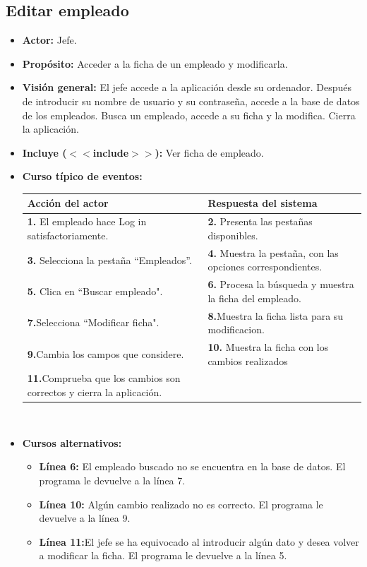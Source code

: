 \documentclass[spanish,a4paper,11pt, twoside]{report}	%
\begin{document}

	\subsection{Editar empleado}		
			\begin{itemize}
			\item \textbf{Actor:} Jefe.
			\item \textbf{Propósito:} Acceder a la ficha de un empleado y modificarla.
			\item \textbf{Visión general:} El jefe accede a la aplicación desde su ordenador. Después de introducir su nombre de usuario y su contraseña, accede a la base de datos de los empleados. Busca un empleado, accede a su ficha y la modifica. Cierra la aplicación. 
			\item \textbf{Incluye ($<<$include$>>$):} Ver ficha de empleado.
			\item \textbf{Curso típico de eventos:} 	\\
				\begin{tabular}{|p{6cm}||p{6cm}|}
				\hline
				\textbf{Acción del actor} & \textbf{Respuesta del sistema} \\ \hline \hline
				\textbf{1.}   El empleado hace Log in satisfactoriamente. & \textbf{2.} Presenta las pestañas disponibles.\\ \hline
				\textbf{3.} Selecciona la pestaña “Empleados”. & \textbf{4.} Muestra la pestaña, con las opciones correspondientes. \\ \hline
				\textbf{5.} Clica en “Buscar empleado".	& \textbf{6.} Procesa la búsqueda y muestra la ficha del empleado. \\ \hline
				\textbf{7.}Selecciona “Modificar ficha". & \textbf{8.}Muestra la ficha lista para su modificacion.\\ \hline
				\textbf{9.}Cambia los campos que considere. & \textbf{10.} Muestra la ficha con los cambios realizados \\ \hline
				\textbf{11.}Comprueba que los cambios son correctos y cierra la aplicación. & \textbf{} \\ \hline
			\end{tabular}
			\\
			\item \textbf{Cursos alternativos:} 
			\begin{itemize}
			\item  \textbf{Línea 6:} El empleado buscado no se encuentra en la base de datos. El programa le devuelve a la línea 7.
			\item  \textbf{Línea 10:} Algún cambio realizado no es correcto. El programa le devuelve a la línea 9.
			\item  \textbf{Línea 11:}El jefe se ha equivocado al introducir algún dato y desea volver a modificar la ficha. El programa le devuelve a la línea 5.
			
			\end {itemize}
		\end{itemize}
\end{document}
